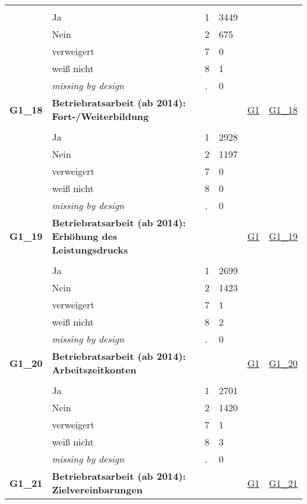 \begin{longtable}{| L{2.45cm} | L{6cm} | C{1.5cm} | R{1cm} | C{2.25cm} | C{2.25cm} |}
   &  &  &  &  &  \\ 
   & Ja & 1 & 3449 &  &  \\ 
   & Nein & 2 & 675 &  &  \\ 
   & verweigert & 7 & 0 &  &  \\ 
   & weiß nicht & 8 & 1 &  &  \\ 
   & \textit{missing by design} & \textit{.} & 0 &  &  \\ 
   \midrule
\textbf{G1\_18}\label{var:G1:18} & \textbf{Betriebratsarbeit (ab 2014): Fort-/Weiterbildung} &  &  & \hyperref[G1]{G1} & \hyperref[var:suf:G1:18]{G1\_18} \\ 
   &  &  &  &  &  \\ 
   & Ja & 1 & 2928 &  &  \\ 
   & Nein & 2 & 1197 &  &  \\ 
   & verweigert & 7 & 0 &  &  \\ 
   & weiß nicht & 8 & 0 &  &  \\ 
   & \textit{missing by design} & \textit{.} & 0 &  &  \\ 
   \midrule
\textbf{G1\_19}\label{var:G1:19} & \textbf{Betriebratsarbeit (ab 2014): Erhöhung des Leistungsdrucks} &  &  & \hyperref[G1]{G1} & \hyperref[var:suf:G1:19]{G1\_19} \\ 
   &  &  &  &  &  \\ 
   & Ja & 1 & 2699 &  &  \\ 
   & Nein & 2 & 1423 &  &  \\ 
   & verweigert & 7 & 1 &  &  \\ 
   & weiß nicht & 8 & 2 &  &  \\ 
   & \textit{missing by design} & \textit{.} & 0 &  &  \\ 
   \midrule
\textbf{G1\_20}\label{var:G1:20} & \textbf{Betriebratsarbeit (ab 2014): Arbeitszeitkonten} &  &  & \hyperref[G1]{G1} & \hyperref[var:suf:G1:20]{G1\_20} \\ 
   &  &  &  &  &  \\ 
   & Ja & 1 & 2701 &  &  \\ 
   & Nein & 2 & 1420 &  &  \\ 
   & verweigert & 7 & 1 &  &  \\ 
   & weiß nicht & 8 & 3 &  &  \\ 
   & \textit{missing by design} & \textit{.} & 0 &  &  \\ 
   \midrule
\textbf{G1\_21}\label{var:G1:21} & \textbf{Betriebratsarbeit (ab 2014): Zielvereinbarungen} &  &  & \hyperref[G1]{G1} & \hyperref[var:suf:G1:21]{G1\_21} \\ 

\end{longtable}
